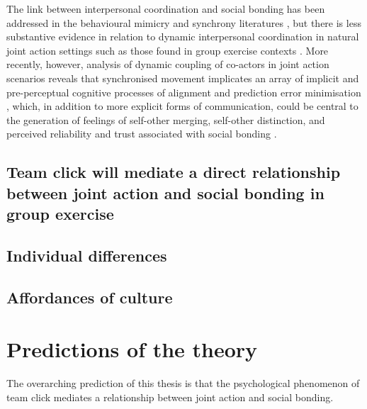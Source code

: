 \begin{CJK}{UTF8}{gbsn}
The link between interpersonal coordination and social bonding has been addressed in the behavioural mimicry and synchrony literatures \citep[e.g.,][]{Wheatley2012,Launay2016,Mogan2017}, but there is less substantive evidence in relation to dynamic interpersonal coordination in natural joint action settings such as those found in group exercise contexts \citep{Marsh2009,Miles2009,Lumsden2012}.  More recently, however, analysis of dynamic coupling of co-actors in joint action scenarios reveals that synchronised movement implicates an array of implicit and pre-perceptual cognitive processes of alignment and prediction error minimisation \citep{Schmidt2011}, which, in addition to more explicit forms of communication, could be central to the generation of feelings of self-other merging, self-other distinction, and perceived reliability and trust associated with social bonding \citep{Marsh2009}.




\subsection{Team click will mediate a direct relationship between joint action and social bonding in group exercise\label{sect:JASuccessSocialBonding}}




\subsection{Individual differences}




\subsection{Affordances of culture}










\section{Predictions of the theory}


    The overarching prediction of this thesis is that the psychological phenomenon of team click mediates a relationship between joint action and social bonding.


\end{CJK}
